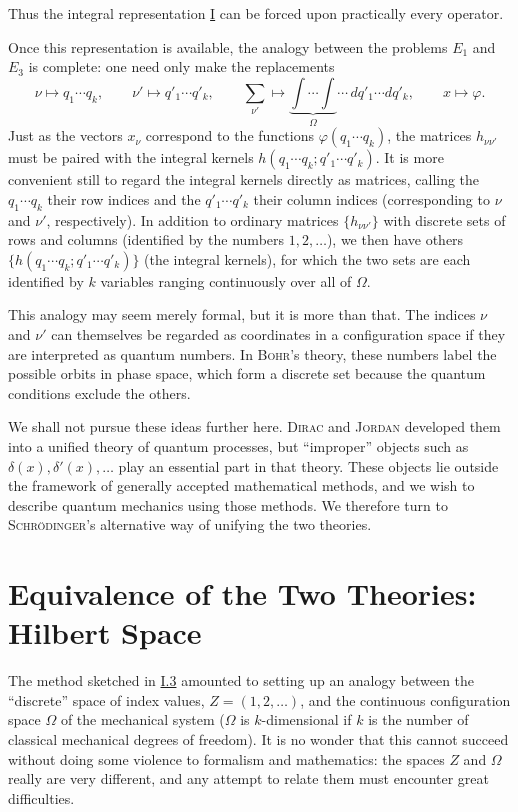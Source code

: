 \documentclass[fontsize=13pt,twoside,openany,headings=normal,parskip=false,bookmarkpackage=false,DIV=calc]{scrbook}
\begin{document}
Thus the integral representation \hyperref[eq:I.3.I]{I} can be forced upon practically every operator.

Once this representation is available, the analogy between the problems \hyperref[eq:I.3.E1]{$E_1$} and \hyperref[eq:I.3.E3]{$E_3$} is complete: one need only make the replacements
\[
 \nu\mapsto q_1\cdots q_k,\qquad \nu'\mapsto q'_1\cdots q'_k,\qquad
 \sum_{\nu'}\mapsto\underbrace{\int\cdots\int}_{\Omega}\cdots\,dq'_1\cdots dq'_k,\qquad x\mapsto\varphi.
\]
 Just as the vectors $x_\nu$ correspond to the functions $\varphi(q_1\cdots q_k)$, the matrices $h_{\nu\nu'}$ must be paired with the integral kernels $h(q_1\cdots q_k;q'_1\cdots q'_k)$. It is more convenient still to regard the integral kernels directly as matrices, calling the $q_1\cdots q_k$ their row indices and the $q'_1\cdots q'_k$ their column indices (corresponding to $\nu$ and $\nu'$, respectively). In addition to ordinary matrices $\{h_{\nu\nu'}\}$ with discrete sets of rows and columns (identified by the numbers $1,2,\ldots$), we then have others $\{h(q_1\cdots q_k;q'_1\cdots q'_k)\}$ (the integral kernels), for which the two sets are each identified by $k$ variables ranging continuously over all of $\Omega$.

This analogy may seem merely formal, but it is more than that. The indices $\nu$ and $\nu'$ can themselves be regarded as coordinates in a configuration space if they are interpreted as quantum numbers. In \textsc{Bohr}'s theory, these numbers label the possible orbits in phase space, which form a discrete set because the quantum conditions exclude the others.

We shall not pursue these ideas further here. \textsc{Dirac} and \textsc{Jordan} developed them into a unified theory of quantum processes, but ``improper'' objects such as $\delta(x),\delta'(x),\ldots$ play an essential part in that theory. These objects lie outside the framework of generally accepted mathematical methods, and we wish to describe quantum mechanics using those methods. We therefore turn to \textsc{Schrödinger}'s alternative way of unifying the two theories.

\section{Equivalence of the Two Theories: Hilbert Space}\label{sec:I.4}
The method sketched in \hyperref[sec:I.3]{I.3} amounted to setting up an analogy between the ``discrete'' space of index values, $Z=(1,2,\ldots)$, and the continuous configuration space $\Omega$ of the mechanical system ($\Omega$ is $k$-dimensional if $k$ is the number of classical mechanical degrees of freedom). It is no wonder that this cannot succeed without doing some violence to formalism and mathematics: the spaces $Z$ and $\Omega$ really are very different, and any attempt to relate them must encounter great difficulties.
\end{document}
